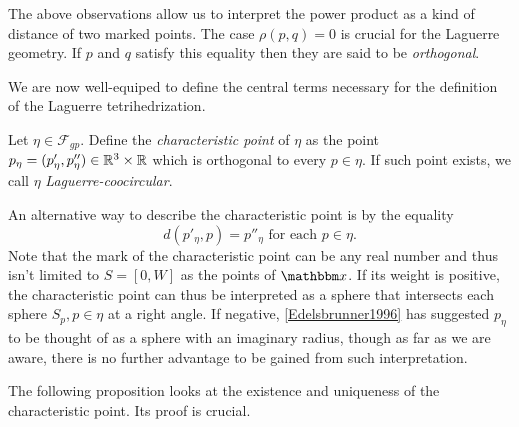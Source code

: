 The above observations allow us to interpret the power product as a kind of distance of two marked points. The case $\rho(p,q)=0$ is crucial for the Laguerre geometry. If $p$ and $q$ satisfy this equality then they are said to be \textit{orthogonal}. 

We are now well-equiped to define the central terms necessary for the definition of the Laguerre tetrihedrization.

\begin{definition}
	Let $\eta\in\mathcal F_{gp}$. Define the \textit{characteristic point} of $\eta$ as the point $p_{\eta} = (p'_\eta, p''_\eta) \in {\mathbb R^3} \times \mathbb R$ which is orthogonal to every $p\in \eta$. If such point exists, we call $\eta$ \textit{Laguerre-coocircular}. 
\end{definition}
An alternative way to describe the characteristic point is by the equality 
\begin{equation}\label{eq:charpoint}
	d(p'_\eta,p)=p''_\eta \text{ for each } p \in \eta.
\end{equation}
Note that the mark of the characteristic point can be any real number and thus isn't limited to $S=[0,W]$ as the points of $\x$.
If its weight is positive, the characteristic point can thus be interpreted as a sphere that intersects each sphere $S_p, p\in\eta$ at a right angle. If negative, \ref{Edelsbrunner1996} has suggested $p_\eta$ to be thought of as a sphere with an imaginary radius, though as far as we are aware, there is no further advantage to be gained from such interpretation. \newline

The following proposition looks at the existence and uniqueness of the characteristic point. Its proof is crucial.


